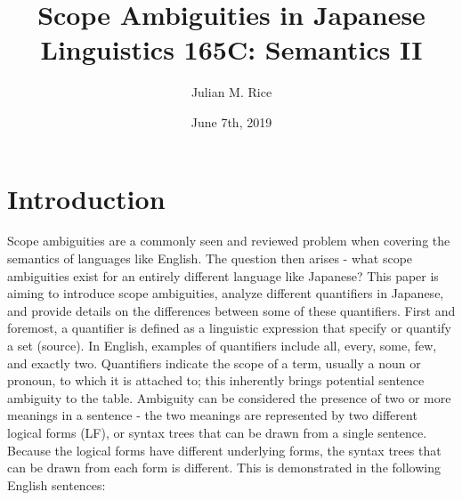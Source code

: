 \documentclass[english, 11pt]{article}
\begin{document}
\rfoot{\thepage}  %
\cfoot{}
\topmargin -0.5in
\title{Scope Ambiguities in Japanese\\
  \large Linguistics 165C: Semantics II
}	%
\author{Julian M. Rice}
\date{June 7th, 2019}
\maketitle

\section{Introduction}
Scope ambiguities are a commonly seen and reviewed problem when covering the semantics of languages like English. The question then arises - what scope ambiguities exist for an entirely different language like Japanese? This paper is aiming to introduce scope ambiguities, analyze different quantifiers in Japanese, and provide details on the differences between some of these quantifiers. First and foremost, a quantifier is defined as a linguistic expression that specify or quantify a set (source). In English, examples of quantifiers include all, every, some, few, and exactly two. Quantifiers indicate the scope of a term, usually a noun or pronoun, to which it is attached to; this inherently brings potential sentence ambiguity to the table. Ambiguity can be considered the presence of two or more meanings in a sentence - the two meanings are represented by two different logical forms (LF), or syntax trees that can be drawn from a single sentence. Because the logical forms have different underlying forms, the syntax trees that can be drawn from each form is different. This is demonstrated in the following English sentences:
\end{document}
